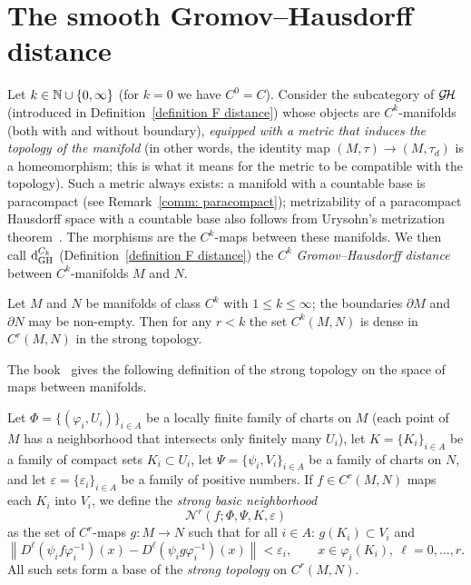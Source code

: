 \section{The smooth Gromov--Hausdorff distance}
  \begin{define}
    Let $k \in {\mathbb N} \cup \{0, \infty\}$ (for $k = 0$ we have $C^0 = C$).
  Consider the subcategory of $\operatorname{\mathcal{G\!H}}$ (introduced in Definition~\ref{definition F distance})
  whose objects are $C^k$-manifolds (both with and without boundary),
  \emph{equipped with a metric that induces the topology of the manifold} (in other words,
  the identity map $(M,\tau)\to(M,\tau_d)$ is a homeomorphism; this is what it means
  for the metric to be compatible with the topology). Such a metric always exists: a manifold with a
  countable base is paracompact (see Remark~\ref{comm: paracompact}); metrizability of a
  paracompact Hausdorff space with a countable base also follows from Urysohn's
  metrization theorem~\cite{E85}. The morphisms are the $C^k$-maps between these manifolds.
We then call $\operatorname{d}^{C_k}_{\mathrm{GH}}$ (Definition~\ref{definition F distance}) the $C^k$ \emph{Gromov--Hausdorff distance} between $C^k$-manifolds $M$ and $N$.
  \end{define}
  \begin{theorem}\label{theorem: smooth approximation}
    Let $M$ and $N$ be manifolds of class $C^k$ with $1 \le k \le \infty$; the boundaries $\partial M$ and $\partial N$ may be non-empty.
    Then for any $r < k$ the set $C^k(M,N)$ is dense in $C^r(M,N)$ in the strong topology.
  \end{theorem}
  The book~\cite[p.~35]{hirsch1976differential} gives the following definition of the strong topology on the space of maps between manifolds.
  \begin{define}
    Let $\Phi = \{(\varphi_i, U_i)\}_{i \in A}$ be a locally finite family of charts on $M$ (each point of $M$ has a neighborhood that intersects only finitely many $U_i$), let $K = \{K_i\}_{i \in A}$ be a family of compact sets $K_i \subset U_i$, let $\Psi = \{\psi_i, V_i\}_{i \in A}$ be a family of charts on $N$, and let $\varepsilon = \{\varepsilon_i\}_{i \in A}$ be a family of positive numbers. If $f \in C^r(M,N)$ maps each $K_i$ into $V_i$, we define the \emph{strong basic neighborhood}
    $$
    \mathcal{N}^r(f; \Phi, \Psi, K, \varepsilon)
    $$
    as the set of $C^r$-maps $g \colon M \to N$ such that for all $i \in A$: $g(K_i) \subset V_i$ and
    $$
    \left\| D^\ell(\psi_i f \varphi_i^{-1})(x) - D^\ell(\psi_i g \varphi_i^{-1})(x) \right\| < \varepsilon_i, \qquad x \in \varphi_i(K_i),\ \ell = 0, \dots, r.
    $$
    All such sets form a base of the \emph{strong topology} on $C^r(M,N)$.
  \end{define}
